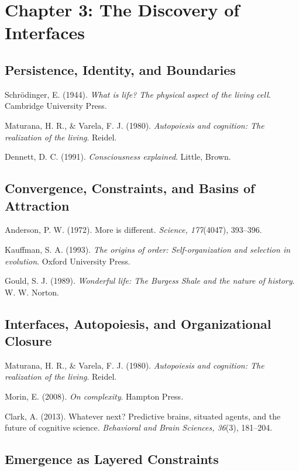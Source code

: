 \documentclass[
  openright]{book}
\begin{document}
\section{Chapter 3: The Discovery of
Interfaces}\label{chapter-3-the-discovery-of-interfaces-1}

\subsection{Persistence, Identity, and
Boundaries}\label{persistence-identity-and-boundaries-1}

Schrödinger, E. (1944). \emph{What is life? The physical aspect of the
living cell}. Cambridge University Press.

Maturana, H. R., \& Varela, F. J. (1980). \emph{Autopoiesis and
cognition: The realization of the living}. Reidel.

Dennett, D. C. (1991). \emph{Consciousness explained}. Little, Brown.

\subsection{Convergence, Constraints, and Basins of
Attraction}\label{convergence-constraints-and-basins-of-attraction-1}

Anderson, P. W. (1972). More is different. \emph{Science, 177}(4047),
393--396.

Kauffman, S. A. (1993). \emph{The origins of order: Self-organization
and selection in evolution}. Oxford University Press.

Gould, S. J. (1989). \emph{Wonderful life: The Burgess Shale and the
nature of history}. W. W. Norton.

\subsection{Interfaces, Autopoiesis, and Organizational
Closure}\label{interfaces-autopoiesis-and-organizational-closure-1}

Maturana, H. R., \& Varela, F. J. (1980). \emph{Autopoiesis and
cognition: The realization of the living}. Reidel.

Morin, E. (2008). \emph{On complexity}. Hampton Press.

Clark, A. (2013). Whatever next? Predictive brains, situated agents, and
the future of cognitive science. \emph{Behavioral and Brain Sciences,
36}(3), 181--204.

\subsection{Emergence as Layered
Constraints}\label{emergence-as-layered-constraints}
\end{document}
